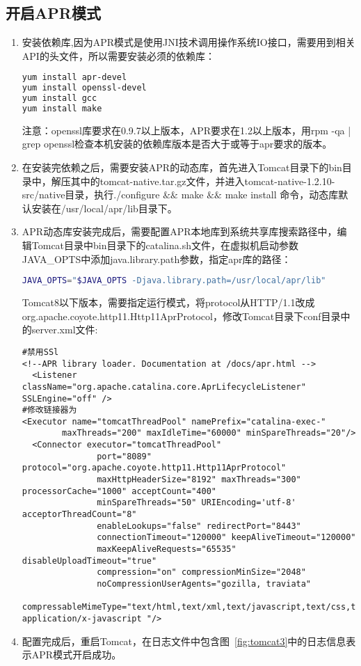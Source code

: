 \subsection{开启APR模式}
\begin{enumerate}
\item 安装依赖库,因为APR模式是使用JNI技术调用操作系统IO接口，需要用到相关API的头文件，所以需要安装必须的依赖库：
\begin{lstlisting}[language=bash,numbers=none]
yum install apr-devel
yum install openssl-devel
yum install gcc
yum install make
\end{lstlisting}
注意：openssl库要求在0.9.7以上版本，APR要求在1.2以上版本，用rpm -qa | grep openssl检查本机安装的依赖库版本是否大于或等于apr要求的版本。

\item 在安装完依赖之后，需要安装APR的动态库，首先进入Tomcat目录下的bin目录中，解压其中的tomcat-native.tar.gz文件，并进入tomcat-native-1.2.10-src/native目录，执行./configure $\&$$\&$ make $\&$$\&$ make install 命令，动态库默认安装在/usr/local/apr/lib目录下。
\item APR动态库安装完成后，需要配置APR本地库到系统共享库搜索路径中，编辑Tomcat目录中bin目录下的catalina.sh文件，在虚拟机启动参数JAVA\_OPTS中添加java.library.path参数，指定apr库的路径：
\begin{lstlisting}[language=bash,numbers=none]
JAVA_OPTS="$JAVA_OPTS -Djava.library.path=/usr/local/apr/lib"
\end{lstlisting}
Tomcat8以下版本，需要指定运行模式，将protocol从HTTP/1.1改成org.apache.coyote.http11.Http11AprProtocol，修改Tomcat目录下conf目录中的server.xml文件:
\begin{lstlisting}[numbers=none]
#禁用SSl
<!--APR library loader. Documentation at /docs/apr.html -->
  <Listener className="org.apache.catalina.core.AprLifecycleListener" SSLEngine="off" />
#修改链接器为
<Executor name="tomcatThreadPool" namePrefix="catalina-exec-"
        maxThreads="200" maxIdleTime="60000" minSpareThreads="20"/>
  <Connector executor="tomcatThreadPool"
               port="8089" protocol="org.apache.coyote.http11.Http11AprProtocol"
               maxHttpHeaderSize="8192" maxThreads="300" processorCache="1000" acceptCount="400"
               minSpareThreads="50" URIEncoding='utf-8'  acceptorThreadCount="8"
               enableLookups="false" redirectPort="8443"
               connectionTimeout="120000" keepAliveTimeout="120000"
               maxKeepAliveRequests="65535" disableUploadTimeout="true"
               compression="on" compressionMinSize="2048"
               noCompressionUserAgents="gozilla, traviata"
               compressableMimeType="text/html,text/xml,text/javascript,text/css,text/plain,application/json,
application/x-javascript "/>
\end{lstlisting}
\item 配置完成后，重启Tomcat，在日志文件中包含图~\ref{fig:tomcat3}中的日志信息表示APR模式开启成功。
\end{enumerate}

